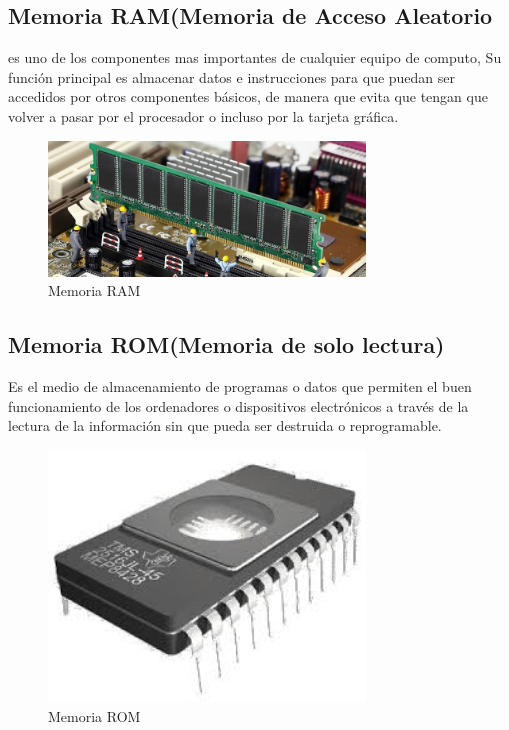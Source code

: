 \documentclass{article}
\begin{document}
\subsection*{Memoria RAM(Memoria de Acceso Aleatorio}
es uno de los componentes mas importantes de cualquier equipo de computo, Su función principal es almacenar datos e instrucciones para que puedan ser accedidos por otros componentes básicos, de manera que evita que tengan que volver a pasar por el procesador o incluso por la tarjeta gráfica.\\[8cm]
\begin{figure}[!]
    \centering
    \includegraphics[width=0.75\textwidth]{ram.jpg}
    \caption{Memoria RAM}
    \label{fig:my_label}
\end{figure}
\subsection*{Memoria ROM(Memoria de solo lectura)}
Es el medio de almacenamiento de programas o datos que permiten el buen funcionamiento de los ordenadores o dispositivos electrónicos a través de la lectura de la información sin que pueda ser destruida o reprogramable.\\[0.1cm]
\begin{figure}[h]
    \centering
    \includegraphics[width=0.75\textwidth]{rom.jpg}
    \caption{Memoria  ROM}
    \label{fig:my_label}
\end{figure}
\end{document}
